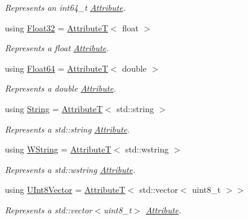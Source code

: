 \begin{DoxyCompactItemize}
\begin{DoxyCompactList}\small\item\em Represents an {\ttfamily int64\+\_\+t} \hyperlink{classdg_1_1deepcore_1_1_attribute}{Attribute}. \end{DoxyCompactList}\item 
using \hyperlink{group___process_attributes_ga61b8924d2ea1e93844df63eab076eccc}{Float32} = \hyperlink{structdg_1_1deepcore_1_1_attribute_t}{AttributeT}$<$ float $>$
\begin{DoxyCompactList}\small\item\em Represents a {\ttfamily float} \hyperlink{classdg_1_1deepcore_1_1_attribute}{Attribute}. \end{DoxyCompactList}\item 
using \hyperlink{group___process_attributes_ga9d504bf1e2018cf5e97d3cca2a08aad9}{Float64} = \hyperlink{structdg_1_1deepcore_1_1_attribute_t}{AttributeT}$<$ double $>$
\begin{DoxyCompactList}\small\item\em Represents a {\ttfamily double} \hyperlink{classdg_1_1deepcore_1_1_attribute}{Attribute}. \end{DoxyCompactList}\item 
using \hyperlink{group___process_attributes_ga84ae1d49f195126fef6224ad5817201e}{String} = \hyperlink{structdg_1_1deepcore_1_1_attribute_t}{AttributeT}$<$ std\+::string $>$
\begin{DoxyCompactList}\small\item\em Represents a {\ttfamily std\+::string} \hyperlink{classdg_1_1deepcore_1_1_attribute}{Attribute}. \end{DoxyCompactList}\item 
using \hyperlink{group___process_attributes_gafbc911757b794babe4866ad9c709fa44}{W\+String} = \hyperlink{structdg_1_1deepcore_1_1_attribute_t}{AttributeT}$<$ std\+::wstring $>$
\begin{DoxyCompactList}\small\item\em Represents a {\ttfamily std\+::wstring} \hyperlink{classdg_1_1deepcore_1_1_attribute}{Attribute}. \end{DoxyCompactList}\item 
using \hyperlink{group___process_attributes_ga122a5889d6ae8010508171b0456ffaa0}{U\+Int8\+Vector} = \hyperlink{structdg_1_1deepcore_1_1_attribute_t}{AttributeT}$<$ std\+::vector$<$ uint8\+\_\+t $>$$>$
\begin{DoxyCompactList}\small\item\em Represents a {\ttfamily std\+::vector$<$uint8\+\_\+t$>$} \hyperlink{classdg_1_1deepcore_1_1_attribute}{Attribute}. \end{DoxyCompactList}\item 
$$
\end{DoxyCompactItemize}
